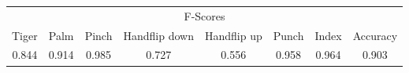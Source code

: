 \documentclass{standalone}
\begin{document}
 
 \begin{tabular}{|c|c|c|c|c|c|c ||c|}
\cline{1-8}\multicolumn{8}{|c|}{F-Scores} \\ 
\cline{1-8}Tiger & Palm & Pinch & Handflip down & Handflip up & Punch & Index & Accuracy\\ 
\cline{1-8}0.844 & 0.914 & 0.985 & 0.727 & 0.556 & 0.958 & 0.964 & 0.903\\ 
 \cline{1-8}\hline \end{tabular}
 
\end{document}
